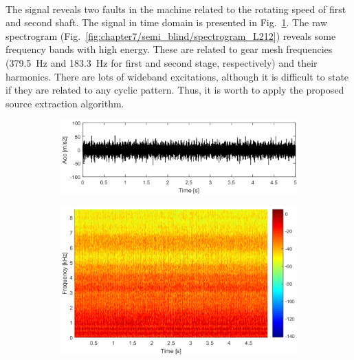 %
\\
The signal reveals two faults in the machine related to the rotating speed of first and second shaft. The signal in time domain is presented in Fig.~\ref{fig:chapter7/semi_blind/time_L212}. The raw spectrogram (Fig.~\ref{fig:chapter7/semi_blind/spectrogram_L212}) reveals some frequency bands with high energy. These are related to gear mesh frequencies (379.5~Hz and 183.3~Hz for first and second stage, respectively) and their harmonics. There are lots of  wideband excitations, although it is difficult to state if they are related to any cyclic pattern. Thus, it is worth to apply the proposed source extraction algorithm.
\begin{figure}
    \centering
    \vspace{-1\baselineskip}
    \begin{subfigure}[b]{0.8\textwidth}
        \centering
        \captionsetup{skip=0.01pt}
        \caption{}
        \includegraphics[width=\textwidth]{wykresy/chapter_application/semi_blind/sygnalL212.png}
        \label{fig:chapter7/semi_blind/time_L212}
    \end{subfigure}
     \vspace{-1\baselineskip}
    \begin{subfigure}[b]{0.8\textwidth}
        \centering
        \captionsetup{skip=0.01pt}
        \caption{}
        \includegraphics[width=\textwidth]{wykresy/chapter_application/semi_blind/spectrogramL212.png}

\end{subfigure}
\end{figure}
